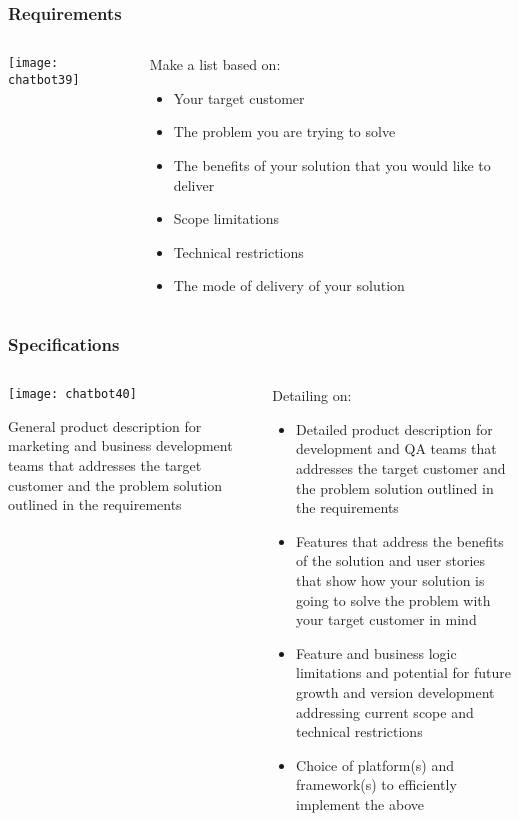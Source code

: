 \begin{frame}[fragile]\frametitle{Requirements}
    \begin{columns}
    \begin{column}[t]{0.5\linewidth}
\begin{center}
\texttt{[image: chatbot39]}
\end{center}
\end{column}
    \begin{column}[t]{0.5\linewidth}
Make a list based on:
\begin{itemize}
\item Your target customer
\item The problem you are trying to solve
\item The benefits of your solution that you would like to deliver
\item Scope limitations
\item Technical restrictions
\item The mode of delivery of your solution
\end{itemize}
\end{column}
\end{columns}
\end{frame}

\begin{frame}[fragile]\frametitle{Specifications}
    \begin{columns}
    \begin{column}[t]{0.5\linewidth}
\begin{center}
\texttt{[image: chatbot40]}
\end{center}

General product description for marketing and business development teams that addresses the target customer and the problem solution outlined in the requirements

\end{column}
    \begin{column}[t]{0.5\linewidth}
Detailing on:
\begin{itemize}
\item Detailed product description for development and QA teams that addresses the target customer and the problem solution outlined in the requirements
\item Features that address the benefits of the solution and user stories that show how your solution is going to solve the problem with your target customer in mind
\item Feature and business logic limitations and potential for future growth and version development addressing current scope and technical restrictions
\item Choice of platform(s) and framework(s) to efficiently implement the above
\end{itemize}
\end{column}
\end{columns}
\end{frame}

